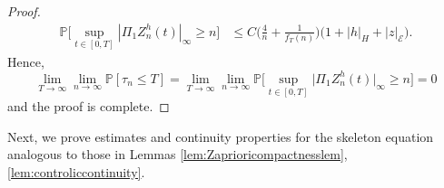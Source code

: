 \documentclass[10pt, reqno]{amsart}
\newcommand{\pr}{\mathbb{P}}
\newcommand{\e}{\mathcal{E}}
\theoremstyle{definition}
\numberwithin{lem}{section}
\numberwithin{cor}{section}
\numberwithin{prop}{section}
\numberwithin{thm}{section}
\numberwithin{dfn}{section}
\begin{document}
\begin{proof}
    	   \begin{equation}\label{Znbnd}
    	   \begin{aligned} 
    	  \pr\bigg[  \sup_{t\in[0,T]}|\Pi_1Z_{n}^{h}(t)|_{\infty}\geq n   \bigg]&\leq C \bigg(\frac{4}{n}+\frac{1}{f_T(n)}\bigg)\big(  1+|h|_{H}+|z|_{\e}\big).
    	   \end{aligned}
    	   \end{equation}
    	   Hence, 
    	   $$\lim_{T\to\infty}\lim_{n\to\infty}\pr[ \tau_n\leq T   ]=\lim_{T\to\infty}\lim_{n\to\infty}\pr\bigg[  \sup_{t\in[0,T]}\big|   \Pi_1Z_{n}^{h}(t)\big|_{\infty}\geq n   \bigg]=0$$
    	    and the proof is complete.    
    	   \end{proof}

           Next, we prove estimates and continuity properties for the skeleton equation analogous to those in Lemmas \ref{lem:Zaprioricompactnesslem}, \ref{lem:controliccontinuity}.

            
\end{document}
